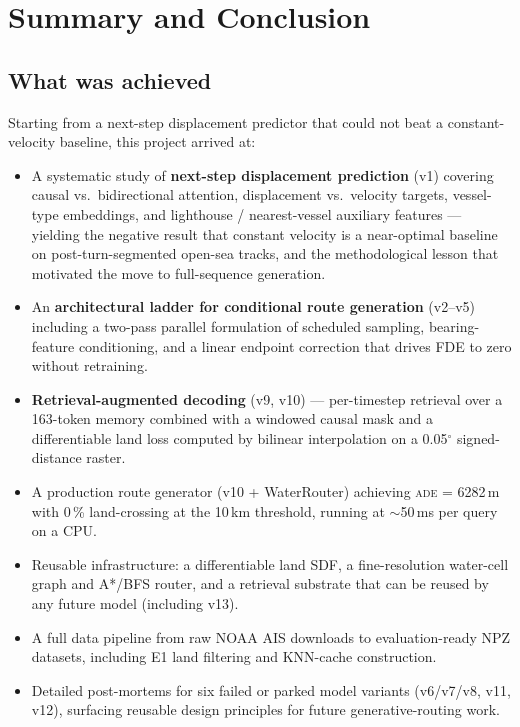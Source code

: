 \documentclass[11pt,a4paper]{article}
\newcommand{\ade}{\textsc{ade}}
\begin{document}
\section{Summary and Conclusion}
\label{sec:conclusion}

\subsection{What was achieved}

Starting from a next-step displacement predictor that could not beat a
constant-velocity baseline, this project arrived at:

\begin{itemize}
  \item A systematic study of \textbf{next-step displacement prediction}
        (v1) covering causal vs.\ bidirectional attention, displacement vs.\
        velocity targets, vessel-type embeddings, and lighthouse / nearest-vessel
        auxiliary features --- yielding the negative result that constant
        velocity is a near-optimal baseline on post-turn-segmented open-sea
        tracks, and the methodological lesson that motivated the move to
        full-sequence generation.
  \item An \textbf{architectural ladder for conditional route generation}
        (v2--v5) including a two-pass parallel formulation of scheduled
        sampling, bearing-feature conditioning, and a linear endpoint
        correction that drives FDE to zero without retraining.
  \item \textbf{Retrieval-augmented decoding} (v9, v10) ---
        per-timestep retrieval over a 163-token memory combined with a
        windowed causal mask and a differentiable land loss computed by
        bilinear interpolation on a 0.05$^{\circ}$ signed-distance raster.
  \item A production route generator (v10 + WaterRouter) achieving
        \ade{} = 6282\,m with 0\,\% land-crossing at the 10\,km threshold,
        running at $\sim$50\,ms per query on a CPU.
  \item Reusable infrastructure: a differentiable land SDF, a fine-resolution
        water-cell graph and A*/BFS router, and a retrieval substrate that
        can be reused by any future model (including v13).
  \item A full data pipeline from raw NOAA AIS downloads to evaluation-ready
        NPZ datasets, including E1 land filtering and KNN-cache construction.
  \item Detailed post-mortems for six failed or parked model variants
        (v6/v7/v8, v11, v12), surfacing reusable design principles
        for future generative-routing work.
\end{itemize}
\end{document}
